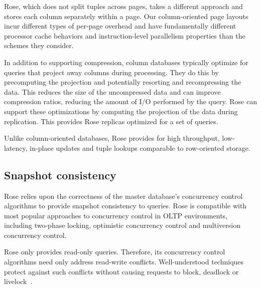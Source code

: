 \documentclass{vldb}
\newcommand{\rows}{Rose\xspace}
\begin{document}
\rows, which does not split tuples across pages, takes a different
approach and stores each column separately within a page.  Our
column-oriented page layouts incur different types of per-page overhead and
have fundamentally different processor
cache behaviors and instruction-level parallelism properties than the
schemes they consider.

In addition to supporting compression, column databases typically
optimize for queries that project away columns during processing.
They do this by precomputing the projection and potentially resorting
and recompressing the data.  This reduces the size of the uncompressed
data and can improve compression ratios, reducing the amount of I/O
performed by the query.  \rows can support these optimizations by
computing the projection of the data during replication.  This
provides \rows replicas optimized for a set of queries.

Unlike column-oriented databases, \rows provides
for high throughput, low-latency, in-place updates and tuple lookups comparable to row-oriented storage.



\subsection{Snapshot consistency}

\rows relies upon the correctness of the master database's concurrency
control algorithms to provide snapshot consistency to queries.  \rows
is compatible with most popular approaches to concurrency control in
OLTP environments, including two-phase locking, optimistic concurrency
control and multiversion concurrency control.

\rows only provides read-only queries.  Therefore, its concurrency
control algorithms need only address read-write conflicts.
Well-understood techniques protect against such conflicts
without causing requests to block, deadlock or
livelock~\cite{concurrencyControl}.
\end{document}
